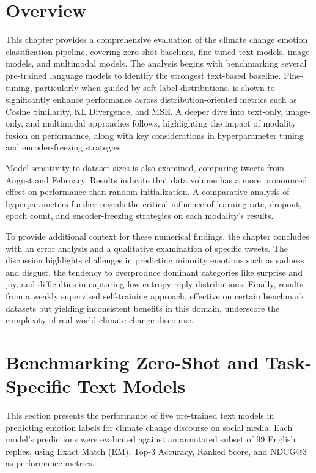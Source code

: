 \section{Overview}  
This chapter provides a comprehensive evaluation of the climate change emotion classification pipeline, covering zero-shot baselines, fine-tuned text models, image models, and multimodal models. The analysis begins with benchmarking several pre-trained language models to identify the strongest text-based baseline. Fine-tuning, particularly when guided by soft label distributions, is shown to significantly enhance performance across distribution-oriented metrics such as Cosine Similarity, KL Divergence, and MSE. A deeper dive into text-only, image-only, and multimodal approaches follows, highlighting the impact of modality fusion on performance, along with key considerations in hyperparameter tuning and encoder-freezing strategies.  
\newline  

Model sensitivity to dataset sizes is also examined, comparing tweets from August and February. Results indicate that data volume has a more pronounced effect on performance than random initialization. A comparative analysis of hyperparameters further reveals the critical influence of learning rate, dropout, epoch count, and encoder-freezing strategies on each modality’s results.  
\newline  

To provide additional context for these numerical findings, the chapter concludes with an error analysis and a qualitative examination of specific tweets. The discussion highlights challenges in predicting minority emotions such as sadness and disgust, the tendency to overproduce dominant categories like surprise and joy, and difficulties in capturing low-entropy reply distributions. Finally, results from a weakly supervised self-training approach, effective on certain benchmark datasets but yielding inconsistent benefits in this domain, underscore the complexity of real-world climate change discourse.

\section{Benchmarking Zero-Shot and Task-Specific Text Models}

This section presents the performance of five pre-trained text models in predicting emotion labels for climate change discourse on social media. Each model’s predictions were evaluated against an annotated subset of 99 English replies, using Exact Match (EM), Top-3 Accuracy, Ranked Score, and NDCG@3 as performance metrics.

